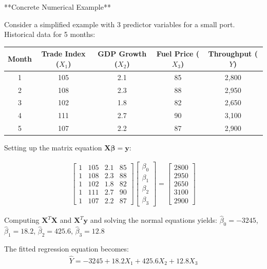 \documentclass{article}
\begin{document}
**Concrete Numerical Example**

Consider a simplified example with 3 predictor variables for a small port. Historical data for 5 months:

\begin{center}
\begin{tabular}{ccccc}
\toprule
Month & Trade Index ($X_1$) & GDP Growth ($X_2$) & Fuel Price ($X_3$) & Throughput ($Y$) \\
\midrule
1 & 105 & 2.1 & 85 & 2,800 \\
2 & 108 & 2.3 & 88 & 2,950 \\
3 & 102 & 1.8 & 82 & 2,650 \\
4 & 111 & 2.7 & 90 & 3,100 \\
5 & 107 & 2.2 & 87 & 2,900 \\
\bottomrule
\end{tabular}
\end{center}

Setting up the matrix equation $\mathbf{X}\boldsymbol{\beta} = \mathbf{y}$:

\begin{align}
\begin{bmatrix}
1 & 105 & 2.1 & 85 \\
1 & 108 & 2.3 & 88 \\
1 & 102 & 1.8 & 82 \\
1 & 111 & 2.7 & 90 \\
1 & 107 & 2.2 & 87
\end{bmatrix}
\begin{bmatrix}
\beta_0 \\ \beta_1 \\ \beta_2 \\ \beta_3
\end{bmatrix}
=
\begin{bmatrix}
2800 \\ 2950 \\ 2650 \\ 3100 \\ 2900
\end{bmatrix}
\end{align}

Computing $\mathbf{X}^T\mathbf{X}$ and $\mathbf{X}^T\mathbf{y}$ and solving the normal equations yields:
$\hat{\beta}_0 = -3245$, $\hat{\beta}_1 = 18.2$, $\hat{\beta}_2 = 425.6$, $\hat{\beta}_3 = 12.8$

The fitted regression equation becomes:
\begin{align}
\hat{Y} = -3245 + 18.2 X_1 + 425.6 X_2 + 12.8 X_3
\end{align}
\end{document}
